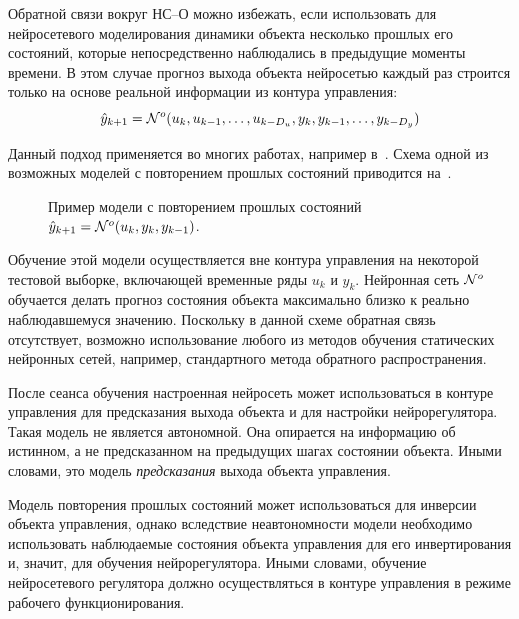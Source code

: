 Обратной связи вокруг НС--О можно избежать, если использовать для
нейросетевого моделирования динамики объекта несколько прошлых его
состояний, которые непосредственно наблюдались в предыдущие моменты
времени.  В этом случае прогноз выхода объекта нейросетью каждый раз
строится только на основе реальной информации из контура управления:
\begin{equation}\label{eq:past-states}
  \hat{y}_{k+1}=\NN^o(u_k, u_{k-1},\ldots,u_{k-D_u}, y_k,
                           y_{k-1},\ldots, y_{k-D_y})
\end{equation}

Данный подход применяется во многих работах, например
в~\cite{kulee96,levinar95}.  Схема одной из возможных моделей с
повторением прошлых состояний приводится
на~.

\begin{figure}[h]
  \centering
  
  \caption{Пример модели с повторением прошлых состояний
  $\hat{y}_{k+1}=\mathcal{N}^o(u_k, y_k, y_{k-1})$.}
  \label{fig:nnp-past-states}
\end{figure}

Обучение этой модели осуществляется вне контура управления на
некоторой тестовой выборке, включающей временные ряды $u_k$ и $y_k$.
Нейронная сеть $\mathcal{N}^o$ обучается делать прогноз состояния
объекта максимально близко к реально наблюдавшемуся значению.
Поскольку в данной схеме обратная связь отсутствует, возможно
использование любого из методов обучения статических нейронных сетей,
например, стандартного метода обратного распространения.

После сеанса обучения настроенная нейросеть может использоваться в
контуре управления для предсказания выхода объекта и для настройки
нейрорегулятора.  Такая модель не является автономной.  Она опирается
на информацию об истинном, а не предсказанном на предыдущих шагах
состоянии объекта.  Иными словами, это модель {\it предсказания
}выхода объекта управления.

Модель повторения прошлых состояний может использоваться для инверсии
объекта управления, однако вследствие неавтономности модели необходимо
использовать наблюдаемые состояния объекта управления для его
инвертирования и, значит, для обучения нейрорегулятора.  Иными
словами, обучение нейросетевого регулятора должно осуществляться в
контуре управления в режиме рабочего функционирования.


